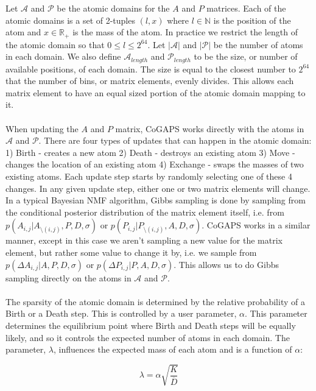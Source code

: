 \documentclass[]{article}
\begin{document}
Let $\mathcal{A}$ and $\mathcal{P}$ be the atomic domains for the $A$ and $P$ matrices. Each of the atomic domains is a set of 2-tuples $(l,x)$ where $l\in\mathbb{N}$ is the position of the atom and $x\in\mathbb{R}_+$ is the mass of the atom. In practice we restrict the length of the atomic domain so that $0 \leq l \leq 2^{64}$. Let $|\mathcal{A}|$ and $|\mathcal{P}|$ be the number of atoms in each domain. We also define $\mathcal{A}_{length}$ and $\mathcal{P}_{length}$ to be the size, or number of available positions, of each domain. The size is equal to the closest number to $2^{64}$ that the number of bins, or matrix elements, evenly divides. This allows each matrix element to have an equal sized portion of the atomic domain mapping to it.\\
\\
When updating the $A$ and $P$ matrix, CoGAPS works directly with the atoms in $\mathcal{A}$ and $\mathcal{P}$. There are four types of updates that can happen in the atomic domain: 1) Birth - creates a new atom 2) Death - destroys an existing atom 3) Move - changes the location of an existing atom 4) Exchange - swaps the masses of two existing atoms. Each update step starts by randomly selecting one of these 4 changes. In any given update step, either one or two matrix elements will change. In a typical Bayesian NMF algorithm, Gibbs sampling is done by sampling from the conditional posterior distribution of the matrix element itself, i.e. from $p(A_{i,j} | A_{\setminus(i,j)}, P, D, \sigma)$ or $p(P_{i,j} | P_{\setminus(i,j)}, A, D, \sigma)$. CoGAPS works in a similar manner, except in this case we aren't sampling a new value for the matrix element, but rather some value to change it by, i.e. we sample from $p(\Delta A_{i,j} | A, P, D, \sigma)$ or $p(\Delta P_{i,j} | P, A, D, \sigma)$. This allows us to do Gibbs sampling directly on the atoms in $\mathcal{A}$ and $\mathcal{P}$.\\
\\
The sparsity of the atomic domain is determined by the relative probability of a Birth or a Death step. This is controlled by a user parameter, $\alpha$. This parameter determines the equilibrium point where Birth and Death steps will be equally likely, and so it controls the expected number of atoms in each domain. The parameter, $\lambda$, influences the expected mass of each atom and is a function of $\alpha$:

\begin{equation}
\lambda = \alpha\sqrt{\dfrac{K}{\overline{D}}}
\end{equation}
\end{document}
